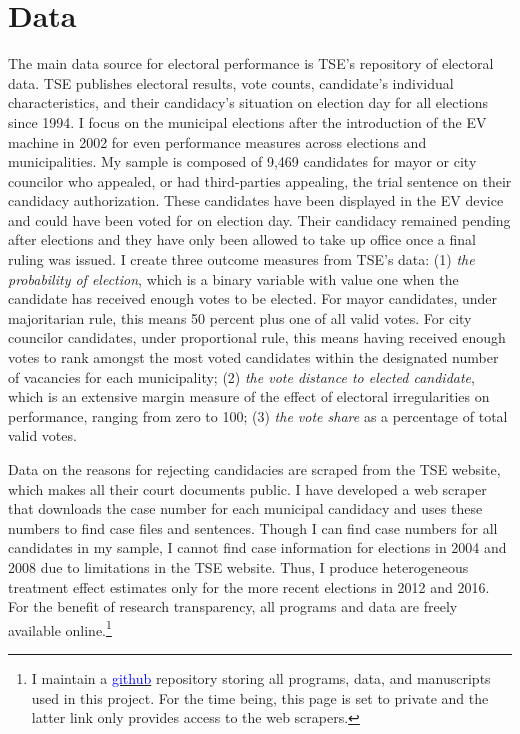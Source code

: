\documentclass[11pt]{article}
\begin{document}
\section{Data} \label{sec:data_paper1}

The main data source for electoral performance is TSE's repository of electoral data. TSE publishes electoral results, vote counts, candidate's individual characteristics, and their candidacy's situation on election day for all elections since 1994. I focus on the municipal elections after the introduction of the EV machine in 2002 for even performance measures across elections and municipalities. My sample is composed of 9,469 candidates for mayor or city councilor who appealed, or had third-parties appealing, the trial sentence on their candidacy authorization. These candidates have been displayed in the EV device and could have been voted for on election day. Their candidacy remained pending after elections and they have only been allowed to take up office once a final ruling was issued. I create three outcome measures from TSE's data: (1) \emph{the probability of election}, which is a binary variable with value one when the candidate has received enough votes to be elected. For mayor candidates, under majoritarian rule, this means 50 percent plus one of all valid votes. For city councilor candidates, under proportional rule, this means having received enough votes to rank amongst the most voted candidates within the designated number of vacancies for each municipality; (2) \emph{the vote distance to elected candidate}, which is an extensive margin measure of the effect of electoral irregularities on performance, ranging from zero to 100; (3) \emph{the  vote share} as a percentage of total valid votes.

Data on the reasons for rejecting candidacies are scraped from the TSE website, which makes all their court documents public. I have developed a web scraper that downloads the case number for each municipal candidacy and uses these numbers to find case files and sentences. Though I can find case numbers for all candidates in my sample, I cannot find case information for elections in 2004 and 2008 due to limitations in the TSE website. Thus, I produce heterogeneous treatment effect estimates only for the more recent elections in 2012 and 2016. For the benefit of research transparency, all programs and data are freely available online.\footnote{I maintain a \href{https://www.github.com/aassumpcao/tse-scraper}{\textcolor{blue}{github}} repository storing all programs, data, and manuscripts used in this project. For the time being, this page is set to private and the latter link only provides access to the web scrapers.}
\end{document}
